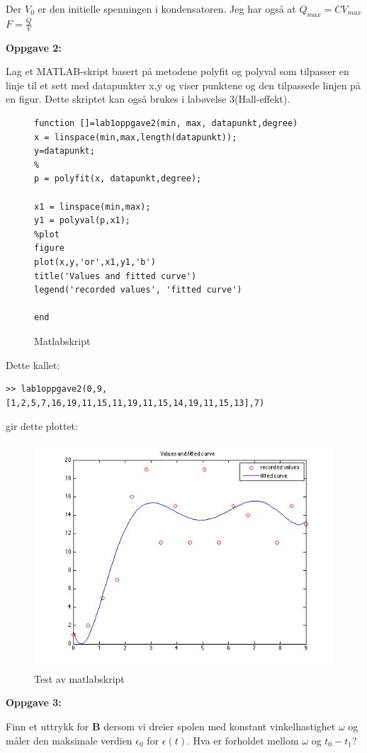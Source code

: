 \documentclass[12pt,a4paper,leqno]{report}
\begin{document}
Der $V_0$ er den initielle spenningen i kondensatoren.
Jeg har også at $Q_{max}=CV_{max}$
$F=\frac{Q}{V}$ 
\pagebreak

\textbf{Oppgave 2:} 

Lag et MATLAB-skript basert på metodene polyfit og polyval som tilpasser en linje til et sett med datapunkter x,y og viser punktene og den tilpassede linjen på en figur. Dette skriptet kan også brukes i labøvelse 3(Hall-effekt).

\begin{figure}
\caption{Matlabskript}
\begin{verbatim}
function []=lab1oppgave2(min, max, datapunkt,degree)
x = linspace(min,max,length(datapunkt));
y=datapunkt;
%
p = polyfit(x, datapunkt,degree);

x1 = linspace(min,max);
y1 = polyval(p,x1);
%plot
figure
plot(x,y,'or',x1,y1,'b')
title('Values and fitted curve')
legend('recorded values', 'fitted curve')

end
\end{verbatim}
\end{figure}
Dette kallet: 
\begin{verbatim}
>> lab1oppgave2(0,9,[1,2,5,7,16,19,11,15,11,19,11,15,14,19,11,15,13],7)
\end{verbatim}
gir dette plottet:
\begin{figure}[H]
\caption{Test av matlabskript}
\centering
\includegraphics[width=\textwidth]{curvefittertest.jpg}
\end{figure}


\textbf{Oppgave 3:} 

 Finn et uttrykk for $\mathbf{B}$ dersom vi dreier spolen med konstant vinkelhastighet $\omega$ og måler den maksimale verdien $\epsilon_0$ for $\epsilon(t)$. Hva er forholdet mellom 
$\omega$ og $t_0-t_1$?
\end{document}
